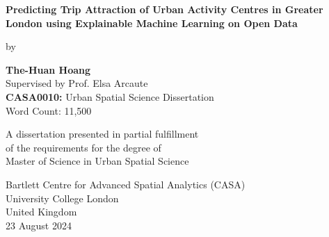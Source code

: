 
 \begin{titlepage}
    \begin{center}
        \vspace*{-3cm}
        
        \vfill %
        

        {\LARGE\textbf{Predicting Trip Attraction of Urban Activity Centres in Greater London using Explainable Machine Learning on Open Data\\}} 

        \vspace{2cm}
        by\\
        \vspace{1cm}
    
        \textbf{The-Huan Hoang\\}
        \vspace{0.2cm}
        Supervised by Prof. Elsa Arcaute\\
        \textbf{CASA0010:} Urban Spatial Science Dissertation\\
        Word Count: 11,500\\
    
        \vfill
             
        A dissertation presented in partial fulfillment \\
        of the requirements for the degree of\\
        Master of Science in Urban Spatial Science
             
        \vspace{1cm}
                 
        Bartlett Centre for Advanced Spatial Analytics (CASA) \\
        University College London\\
        United Kingdom\\
        23 August 2024
    
    \end{center}
\end{titlepage}
